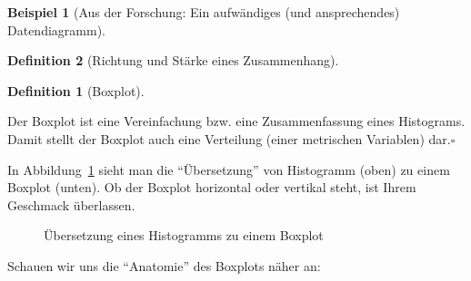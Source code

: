 \documentclass[
  a4paper,
]{scrbook}
\theoremstyle{definition}
\newtheorem{example}{Beispiel}[chapter]
\theoremstyle{definition}
\newtheorem{definition}{Definition}[chapter]
\theoremstyle{definition}
\theoremstyle{remark}
\begin{document}
\begin{example}[Aus der Forschung: Ein aufwändiges (und ansprechendes)
Datendiagramm]
\begin{definition}[Richtung und Stärke eines
Zusammenhang]
\begin{figure}
\end{figure}%

\begin{definition}[Boxplot]\protect\hypertarget{def-boxplot}{}\label{def-boxplot}

Der Boxplot ist eine Vereinfachung bzw. eine Zusammenfassung eines
Histograms. Damit stellt der Boxplot auch eine Verteilung (einer
metrischen Variablen) dar.\(\square\)

\end{definition}

In Abbildung~\ref{fig-hist-to-box} sieht man die ``Übersetzung'' von
Histogramm (oben) zu einem Boxplot (unten). Ob der Boxplot horizontal
oder vertikal steht, ist Ihrem Geschmack überlassen.

\begin{figure}


\caption{\label{fig-hist-to-box}Übersetzung eines Histogramms zu einem
Boxplot}

\end{figure}%

Schauen wir uns die ``Anatomie'' des Boxplots näher an:


\end{definition}
\end{example}
\end{document}
